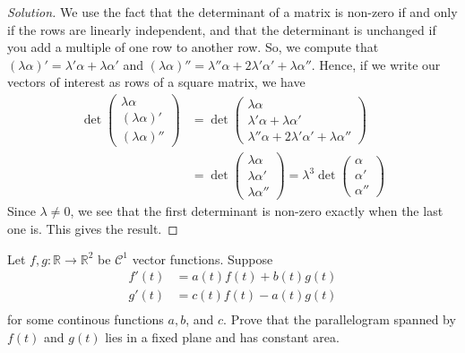 \documentclass[Shifrin_Solutions_Spring_2018]{subfiles}
\begin{document}
\begin{proof}[Solution]
We use the fact that the determinant of a matrix is non-zero if and only if the rows are linearly independent, and that the determinant is unchanged if you add a multiple of one row to another row.
So, we compute that $(\lambda \alpha) ' = \lambda' \alpha  + \lambda \alpha'$ and $(\lambda\alpha)'' = \lambda'' \alpha + 2\lambda'\alpha' + \lambda\alpha''$. Hence, if we write our vectors of interest as rows of a square matrix, we have
\[
\begin{split}
\det \begin{pmatrix} \lambda \alpha \\ (\lambda\alpha)' \\ (\lambda\alpha)'' \end{pmatrix} & =  \det \begin{pmatrix} \lambda\alpha \\ \lambda' \alpha  + \lambda \alpha' \\ \lambda'' \alpha + 2\lambda'\alpha' + \lambda\alpha''\end{pmatrix} \\
& = \det \begin{pmatrix} \lambda \alpha \\ \lambda \alpha' \\ \lambda \alpha'' \end{pmatrix}
 = \lambda^3 \det \begin{pmatrix} \alpha \\ \alpha' \\ \alpha''\end{pmatrix}
\end{split}
\]
Since $\lambda \neq 0$, we see that the first determinant is non-zero exactly when the last one is. This gives the result.
\end{proof}


\vspace{1cm}


\begin{exercise}
Let $f, g: \mathbb{R} \rightarrow \mathbb{R}^2$ be $\mathcal{C}^1$ vector functions. Suppose
\begin{align*}
f'(t) &= a(t) f(t) + b(t)g(t) \\
g'(t) &= c(t)f(t) - a(t)g(t) \\
\end{align*}
for some continous functions $a, b$, and $c$. Prove that the parallelogram spanned by $f(t)$ and $g(t)$ lies in a fixed plane and has constant area.
\end{exercise}
\end{document}
